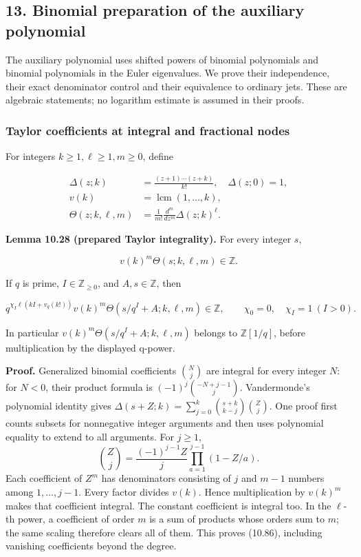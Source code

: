 \documentclass[
  11pt,
  a4paper,
]{article}
\begin{document}
\subsection{13. Binomial preparation of the auxiliary
polynomial}\label{binomial-preparation-of-the-auxiliary-polynomial}

The auxiliary polynomial uses shifted powers of binomial polynomials and
binomial polynomials in the Euler eigenvalues. We prove their
independence, their exact denominator control and their equivalence to
ordinary jets. These are algebraic statements; no logarithm estimate is
assumed in their proofs.

\subsubsection{Taylor coefficients at integral and fractional
nodes}\label{taylor-coefficients-at-integral-and-fractional-nodes}

For integers \(k\ge1,\ell\ge1,m\ge0\), define

\[
\begin{aligned}
\Delta(z;k)&=\frac{(z+1)\cdots(z+k)}{k!},\quad \Delta(z;0)=1,\\
v(k)&=\operatorname{lcm}(1,\ldots,k),\\
\Theta(z;k,\ell,m)&=\frac1{m!}\frac{d^m}{dz^m}\Delta(z;k)^\ell.
\end{aligned}
\tag{10.85}
\]

\textbf{Lemma 10.28 (prepared Taylor integrality).} For every integer
\(s\),

\[
v(k)^m\Theta(s;k,\ell,m)\in\mathbb Z.
\tag{10.86}
\]

If \(q\) is prime, \(I\in\mathbb Z_{\ge0}\), and \(A,s\in\mathbb Z\),
then

\[
q^{\chi_I\ell(kI+v_q(k!))}v(k)^m
\Theta(s/q^I+A;k,\ell,m)\in\mathbb Z,
\qquad \chi_0=0,\quad\chi_I=1\ (I>0).
\tag{10.87}
\]

In particular \(v(k)^m\Theta(s/q^I+A;k,\ell,m)\) belongs to
\(\mathbb Z[1/q]\), before multiplication by the displayed q-power.

\textbf{Proof.} Generalized binomial coefficients \(\binom Nj\) are
integral for every integer \(N\): for \(N<0\), their product formula is
\((-1)^j\binom{-N+j-1}j\). Vandermonde's polynomial identity gives
\(\Delta(s+Z;k)=\sum_{j=0}^k\binom{s+k}{k-j}\binom Zj\). One proof first
counts subsets for nonnegative integer arguments and then uses
polynomial equality to extend to all arguments. For \(j\ge1\), \[
\binom Zj=\frac{(-1)^{j-1}Z}{j}
\prod_{a=1}^{j-1}(1-Z/a).
\] Each coefficient of \(Z^m\) has denominators consisting of \(j\) and
\(m-1\) numbers among \(1,\ldots,j-1\). Every factor divides \(v(k)\).
Hence multiplication by \(v(k)^m\) makes that coefficient integral. The
constant coefficient is integral too. In the \(\ell\)-th power, a
coefficient of order \(m\) is a sum of products whose orders sum to
\(m\); the same scaling therefore clears all of them. This proves
(10.86), including vanishing coefficients beyond the degree.
\end{document}
